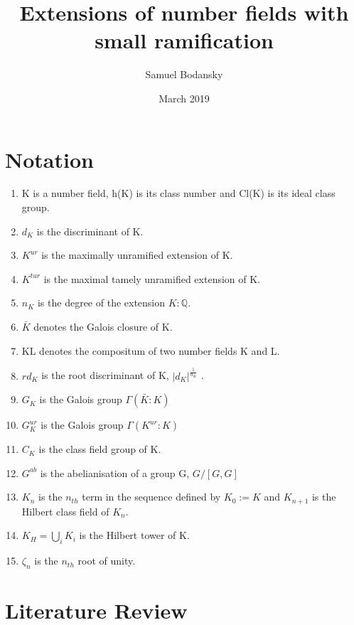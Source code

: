 \documentclass[12pt]{extarticle}
\title{Extensions of number fields with small ramification}
\author{Samuel Bodansky}
\date{March 2019}
\newcommand{\<}{\langle}
\renewcommand{\>}{\rangle}
\theoremstyle{definition}
\begin{document}
\maketitle

\section{Notation}
\begin{enumerate}
    \item K is a number field, h(K) is its class number and Cl(K) is its ideal class group.
    \item $d_K$ is the discriminant of K.
    \item $K^{ur}$ is the maximally unramified extension of K.
    \item $K^{tur}$ is the maximal tamely unramified extension of K.
    \item $n_K$ is the degree of the extension $K:\mathbb{Q}$.
    \item $\bar{K}$ denotes the Galois closure of K.
    \item KL denotes the compositum of two number fields K and L.
    \item $rd_K$ is the root discriminant of K, $|d_K|^\frac{1}{n_K}$ .
    \item $G_K$ is the Galois group $\Gamma(\bar{K}:K)$
    \item $G_K^{ur}$ is the Galois group $\Gamma(K^{ur}:K)$
    \item $C_K$ is the class field group of K. 
    \item $G^{ab}$ is the abelianisation of a group G, $G/[G,G]$
    \item $K_n$ is the $n_{th}$ term in the sequence defined by $K_0:=K$ and $K_{n+1}$ is the Hilbert class field of $K_n$.
    \item $K_H=\bigcup_{i}K_{i}$ is the Hilbert tower of K.  
    \item $\zeta_n$ is the $n_{th}$ root of unity. 
\end{enumerate}
\section{Literature Review}
\end{document}

